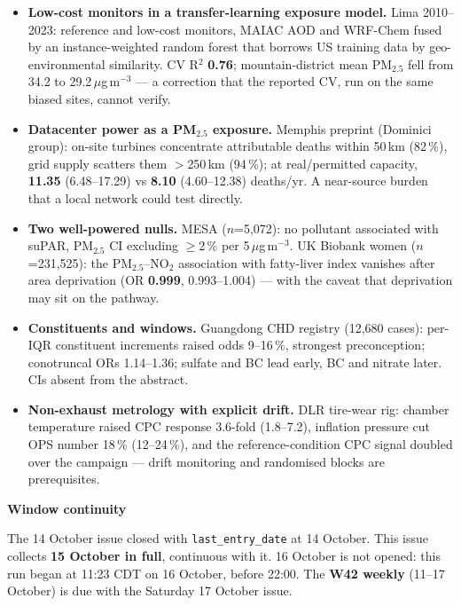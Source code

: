 \documentclass[10pt]{article}
\begin{document}
\footnotesize
\begin{itemize}

\item \textbf{Low-cost monitors in a transfer-learning exposure model.} Lima 2010--2023: reference and low-cost
monitors, MAIAC AOD and WRF-Chem fused by an instance-weighted random forest that borrows US training data by
geo-environmental similarity. CV R$^2$ \textbf{0.76}; mountain-district mean PM$_{2.5}$ fell from 34.2 to
29.2\,$\mu$g\,m$^{-3}$ --- a correction that the reported CV, run on the same biased sites, cannot verify.

\item \textbf{Datacenter power as a PM$_{2.5}$ exposure.} Memphis preprint (Dominici group): on-site turbines
concentrate attributable deaths within 50\,km (82\,\%), grid supply scatters them $>$250\,km (94\,\%); at
real/permitted capacity, \textbf{11.35} (6.48--17.29) vs \textbf{8.10} (4.60--12.38) deaths/yr. A near-source
burden that a local network could test directly.

\item \textbf{Two well-powered nulls.} MESA ($n$=5,072): no pollutant associated with suPAR, PM$_{2.5}$ CI
excluding $\geq$2\,\% per 5\,$\mu$g\,m$^{-3}$. UK Biobank women ($n$=231,525): the PM$_{2.5}$--NO$_2$
association with fatty-liver index vanishes after area deprivation (OR \textbf{0.999}, 0.993--1.004) --- with
the caveat that deprivation may sit on the pathway.

\item \textbf{Constituents and windows.} Guangdong CHD registry (12,680 cases): per-IQR constituent increments
raised odds 9--16\,\%, strongest preconception; conotruncal ORs 1.14--1.36; sulfate and BC lead early, BC and
nitrate later. CIs absent from the abstract.

\item \textbf{Non-exhaust metrology with explicit drift.} DLR tire-wear rig: chamber temperature raised CPC
response 3.6-fold (1.8--7.2), inflation pressure cut OPS number 18\,\% (12--24\,\%), and the reference-condition
CPC signal doubled over the campaign --- drift monitoring and randomised blocks are prerequisites.

\end{itemize}

\vspace{2mm}

\begin{keybox}
{\sffamily\bfseries\footnotesize\color{Deep}Window continuity}\\[1.2mm]
{\fontsize{7.2}{8.8}\selectfont
The 14 October issue closed with \texttt{last\_entry\_date} at 14 October. This issue collects
\textbf{15 October in full}, continuous with it. 16 October is not opened: this run began at 11:23 CDT on
16 October, before 22:00. The \textbf{W42 weekly} (11--17 October) is due with the Saturday 17 October issue.\par}
\end{keybox}
\end{document}
